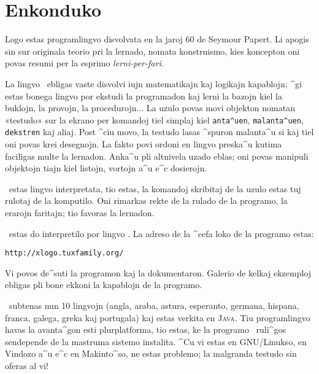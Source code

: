 \chapter*{Enkonduko}

Logo estas programlingvo disvolvata en la jaroj 60 de Seymour Papert.
Li apogis sin sur originala teorio pri la lernado, nomata konstruismo,
kies koncepton oni povas resumi per la esprimo
\og\textit{lerni-per-fari}\fg.

La lingvo \logo\ ebligas vaste disvolvi iujn matematikajn kaj logikajn
kapablojn; ^gi estas bonega lingvo por ekstudi la programadon kaj
lerni la bazojn kiel la buklojn, la provojn, la procedurojn...  La
uzulo povas movi objekton nomatan «testudo» sur la ekrano per komandoj
tiel simplaj kiel \texttt{anta^uen}, \texttt{malanta^uen},
\texttt{dekstren} kaj aliaj.  Post ^ciu movo, la testudo lasas ^spuron
malanta^u si kaj tiel oni povas krei desegnojn.  La fakto povi ordoni
en lingvo preska^u kutima faciligas multe la lernadon.  Anka^u pli
altnivela uzado eblas; oni povas manipuli objektojn tiajn kiel
listojn, vortojn a^u e^c dosierojn.

\logo\ estas lingvo interpretata, tio estas, la komandoj skribitaj de
la uzulo estas tuj rulotaj de la komputilo.  Oni rimarkas rekte de la
rulado de la programo, la erarojn faritajn; tio favoras la lernadon.

\xlogo\ estas do interpretilo por lingvo \logo.  La adreso de la ^cefa
loko de la programo estas:
\begin{center}
\texttt{http://xlogo.tuxfamily.org/}
\end{center}
Vi povos de^suti la programon kaj la dokumentaron.  Galerio de kelkaj
ekzemploj ebligas pli bone ekkoni la kapablojn de la programo.

\xlogo\ subtenas nun 10 lingvojn (angla, araba, astura, esperanto,
germana, hispana, franca, galega, greka kaj portugala) kaj estas
verkita en \textsc{Java}.  Tiu programlingvo havas la avanta^gon esti
plurplatforma, tio estas, ke la programo \xlogo\ ruli^gos sendepende
de la mastruma sistemo instalita.  ^Cu vi estas en GNU/Linukso, en
Vindozo a^u e^c en Makinto^so, ne estas problemo; la malgranda testudo
sin oferas al vi!\\

